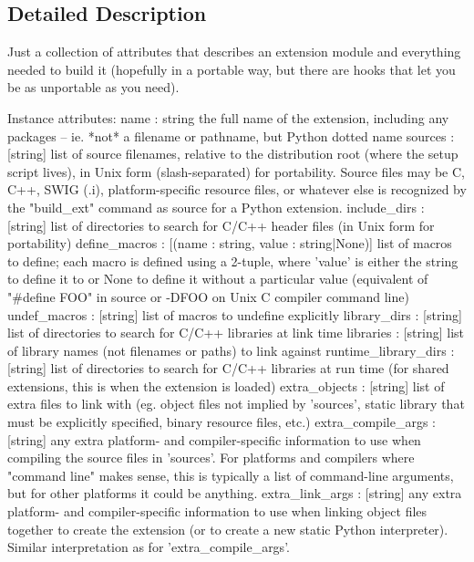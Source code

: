 \subsection{Detailed Description}
\begin{DoxyVerb}Just a collection of attributes that describes an extension
module and everything needed to build it (hopefully in a portable
way, but there are hooks that let you be as unportable as you need).

Instance attributes:
  name : string
    the full name of the extension, including any packages -- ie.
    *not* a filename or pathname, but Python dotted name
  sources : [string]
    list of source filenames, relative to the distribution root
    (where the setup script lives), in Unix form (slash-separated)
    for portability.  Source files may be C, C++, SWIG (.i),
    platform-specific resource files, or whatever else is recognized
    by the "build_ext" command as source for a Python extension.
  include_dirs : [string]
    list of directories to search for C/C++ header files (in Unix
    form for portability)
  define_macros : [(name : string, value : string|None)]
    list of macros to define; each macro is defined using a 2-tuple,
    where 'value' is either the string to define it to or None to
    define it without a particular value (equivalent of "#define
    FOO" in source or -DFOO on Unix C compiler command line)
  undef_macros : [string]
    list of macros to undefine explicitly
  library_dirs : [string]
    list of directories to search for C/C++ libraries at link time
  libraries : [string]
    list of library names (not filenames or paths) to link against
  runtime_library_dirs : [string]
    list of directories to search for C/C++ libraries at run time
    (for shared extensions, this is when the extension is loaded)
  extra_objects : [string]
    list of extra files to link with (eg. object files not implied
    by 'sources', static library that must be explicitly specified,
    binary resource files, etc.)
  extra_compile_args : [string]
    any extra platform- and compiler-specific information to use
    when compiling the source files in 'sources'.  For platforms and
    compilers where "command line" makes sense, this is typically a
    list of command-line arguments, but for other platforms it could
    be anything.
  extra_link_args : [string]
    any extra platform- and compiler-specific information to use
    when linking object files together to create the extension (or
    to create a new static Python interpreter).  Similar
    interpretation as for 'extra_compile_args'.

\end{DoxyVerb}
